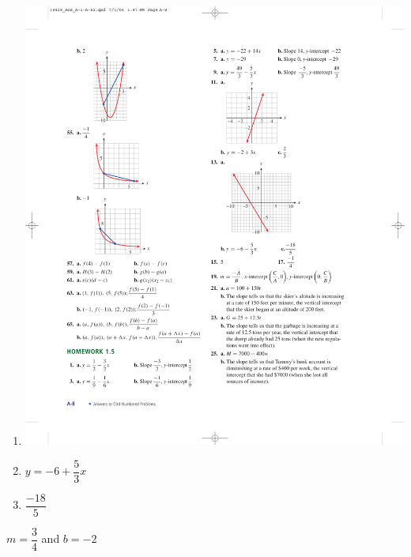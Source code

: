 \documentclass[10pt,]{book}
\theoremstyle{plain}
\theoremstyle{definition}
\theoremstyle{definition}
\theoremstyle{definition}
\theoremstyle{definition}
\numberwithin{equation}{part}
\begin{document}
\begin{exercisegroup}
\begin{multicols}{3}
\begin{enumerate}[label=*\alph**]
\item\hypertarget{li-1165}{}\includegraphics[width=0.95\linewidth]{images/fig-ans-1-5-13}
%
\item\hypertarget{li-1166}{}\(y = -6 + \dfrac{5}{3}x\)%
\item\hypertarget{li-1167}{}\(\dfrac{-18}{5} \)%
\end{enumerate}
\end{multicols}
%
\exercise[14.]\hypertarget{exercise-300}{}\(m = \dfrac{3}{4}\) and \(b = -2\)%
\end{exercisegroup}
\par\smallskip\noindent
\end{document}
